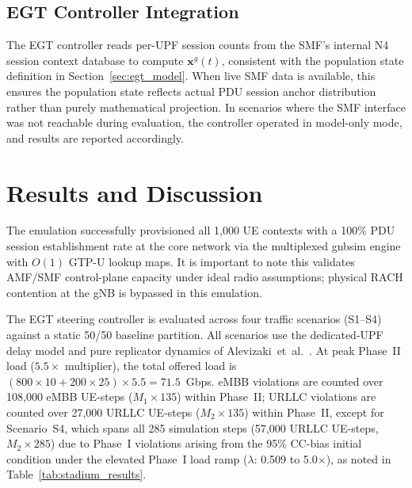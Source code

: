 \documentclass[conference]{IEEEtran}
\begin{document}
\subsection{EGT Controller Integration}
\label{sec:controller_integration}

The EGT controller reads per-UPF session counts from
the SMF's internal N4 session context database to compute
$\mathbf{x}^g(t)$, consistent with the population state
definition in Section~\ref{sec:egt_model}.
When live SMF data is available, this ensures the
population state reflects actual PDU session anchor
distribution rather than purely mathematical projection.
In scenarios where the SMF interface was not reachable
during evaluation, the controller operated in model-only
mode, and results are reported accordingly.

\section{Results and Discussion}
\label{sec:results}

The emulation successfully provisioned all 1,000 UE contexts
with a 100\% PDU session establishment rate at the core network
via the multiplexed gnbsim engine with $O(1)$ GTP-U lookup maps.
It is important to note this validates AMF/SMF control-plane
capacity under ideal radio assumptions; physical RACH contention
at the gNB is bypassed in this emulation.

The EGT steering controller is evaluated across four traffic
scenarios (S1--S4) against a static 50/50 baseline partition.
All scenarios use the dedicated-UPF delay model and pure
replicator dynamics of Alevizaki~et~al.~\cite{Alevizaki2021upf}.
At peak Phase~II load ($5.5\times$ multiplier), the total offered
load is $(800 \times 10 + 200 \times 25) \times 5.5 = 71.5$~Gbps.
eMBB violations are counted over 108,000 eMBB UE-steps
($M_1 \times 135$) within Phase~II; URLLC violations are counted
over 27,000 URLLC UE-steps ($M_2 \times 135$) within Phase~II,
except for Scenario~S4, which spans all 285 simulation steps
(57,000 URLLC UE-steps, $M_2 \times 285$) due to Phase~I
violations arising from the 95\% CC-bias initial condition under
the elevated Phase~I load ramp ($\lambda$: 0.509 to 5.0$\times$),
as noted in Table~\ref{tab:stadium_results}.
\end{document}
